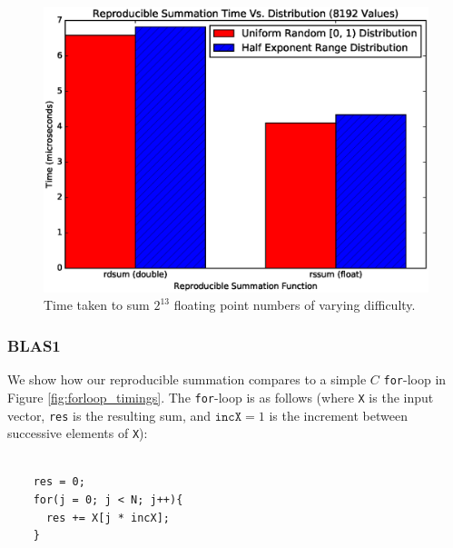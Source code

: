   \begin{figure}[H]
  \begin{center}
  \includegraphics[width=\textwidth]{plots/easy_vs_hard}
  \caption{Time taken to sum $2^{13}$ floating point numbers of varying difficulty.}
  \label{fig:easy_vs_hard_timings}
  \end{center}
  \end{figure}
  \subsubsection{BLAS1}

    We show how our reproducible summation compares to a simple $C$ \texttt{for}-loop in Figure \ref{fig:forloop_timings}. The \texttt{for}-loop is as follows (where \texttt{X} is the input vector, \texttt{res} is the resulting sum, and $\texttt{incX} = 1$ is the increment between successive elements of \texttt{X}):
    \begin{lstlisting}

    res = 0;
    for(j = 0; j < N; j++){
      res += X[j * incX];
    }
    \end{lstlisting}

